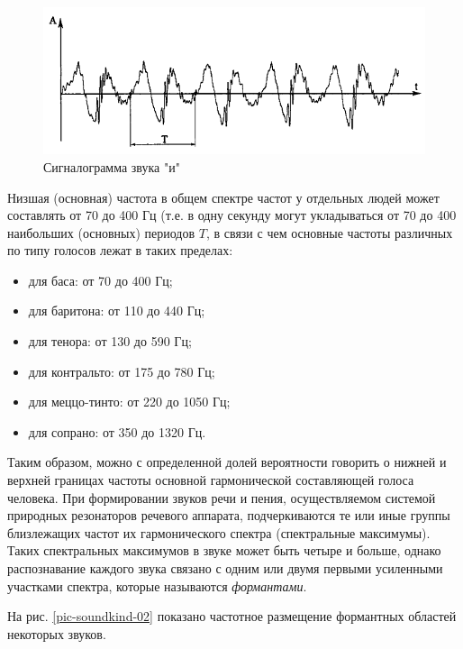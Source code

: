 \documentclass[oneside, final, 14pt]{extreport}
\begin{document}
\begin{figure}[h]
\centering
\includegraphics{pic-soundkind-01}
\caption{Сигналограмма звука "и"}
\label{pic-soundkind-01}
\end{figure}

Низшая (основная) частота в общем спектре частот у отдельных людей может составлять от 70 до 400 Гц (т.е. в одну секунду могут укладываться от 70 до 400 наибольших (основных) периодов \(T\), в связи с чем основные частоты различных по типу голосов лежат в таких пределах:
\begin{itemize}
  \item для баса: от 70 до 400 Гц;
  \item для баритона: от 110 до 440 Гц;
  \item для тенора: от 130 до 590 Гц;
  \item для контральто: от 175 до 780 Гц;
  \item для меццо-тинто: от 220 до 1050 Гц;
  \item для сопрано: от 350 до 1320 Гц.
\end{itemize}

Таким образом, можно с определенной долей вероятности говорить о нижней и верхней границах частоты основной гармонической составляющей голоса человека. При формировании звуков речи и пения, осуществляемом системой природных резонаторов речевого аппарата, подчеркиваются те или иные группы близлежащих частот их гармонического спектра (спектральные максимумы). Таких спектральных максимумов в звуке может быть четыре и больше, однако распознавание каждого звука связано с одним или двумя первыми усиленными участками спектра, которые называются {\itshape формантами}.

На рис. \ref{pic-soundkind-02} показано частотное размещение формантных областей некоторых звуков.
\end{document}
